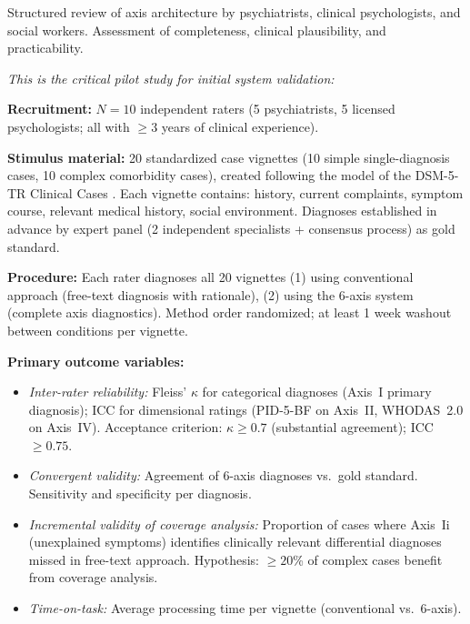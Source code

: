 \documentclass[11pt,a4paper]{article}
\begin{document}
\begin{description}[style=nextline, leftmargin=1.5cm, font=\bfseries]
\item[Phase~1: Expert Review (N=10--15)] Structured review of axis architecture by psychiatrists, clinical psychologists, and social workers. Assessment of completeness, clinical plausibility, and practicability.

\item[Phase~2: Inter-Rater Reliability Study with Case Vignettes (N=10 raters, 20 vignettes)] \textit{This is the critical pilot study for initial system validation:}

\textbf{Recruitment:} $N = 10$ independent raters (5 psychiatrists, 5 licensed psychologists; all with $\geq 3$ years of clinical experience).

\textbf{Stimulus material:} 20 standardized case vignettes (10 simple single-diagnosis cases, 10 complex comorbidity cases), created following the model of the DSM-5-TR Clinical Cases \citep{BarnhillDSM5ClinicalCases}. Each vignette contains: history, current complaints, symptom course, relevant medical history, social environment. Diagnoses established in advance by expert panel (2 independent specialists + consensus process) as gold standard.

\textbf{Procedure:} Each rater diagnoses all 20 vignettes (1) using conventional approach (free-text diagnosis with rationale), (2) using the 6-axis system (complete axis diagnostics). Method order randomized; at least 1 week washout between conditions per vignette.

\textbf{Primary outcome variables:}
\begin{itemize}[leftmargin=*, noitemsep]
    \item \textit{Inter-rater reliability:} Fleiss' $\kappa$ for categorical diagnoses (Axis~I primary diagnosis); ICC for dimensional ratings (PID-5-BF on Axis~II, WHODAS~2.0 on Axis~IV). Acceptance criterion: $\kappa \geq 0.7$ (substantial agreement); ICC $\geq 0.75$.
    \item \textit{Convergent validity:} Agreement of 6-axis diagnoses vs.\ gold standard. Sensitivity and specificity per diagnosis.
    \item \textit{Incremental validity of coverage analysis:} Proportion of cases where Axis~Ii (unexplained symptoms) identifies clinically relevant differential diagnoses missed in free-text approach. Hypothesis: $\geq 20$\% of complex cases benefit from coverage analysis.
    \item \textit{Time-on-task:} Average processing time per vignette (conventional vs.\ 6-axis).
\end{itemize}


\end{description}
\end{document}
